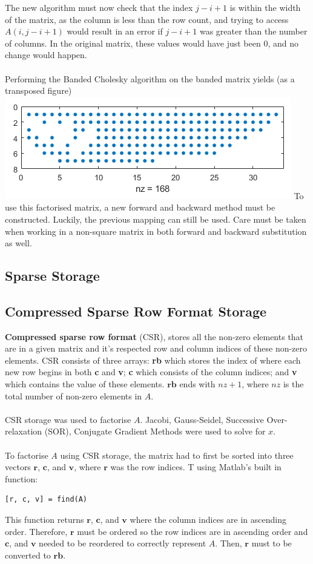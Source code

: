 \documentclass[12pt,a4paper]{article}
\begin{document}
The new algorithm must now check that the index $j-i+1$ is within the width of the matrix, as the column is less than the row count, and trying to access $A(i,j-i+1)$ would result in an error if $j-i+1$ was greater than the number of columns. In the original matrix, these values would have just been 0, and no change would happen.\\\\Performing the Banded Cholesky algorithm on the banded matrix yields (as a transposed figure) \\\includegraphics{images/cholband.png}
To use this factorised matrix, a new forward and backward method must be constructed. Luckily, the previous mapping can still be used. Care must be taken when working in a non-square matrix in both forward and backward substitution as well.
\subsection{Sparse Storage}

\subsection{Compressed Sparse Row Format Storage}
\textbf{Compressed sparse row format} (CSR), stores all the non-zero elements that are in a given matrix and it's respected row and column indices of these non-zero elements. CSR consists of three arrays: \textbf{rb} which stores the index of where each new row begins in both \textbf{c} and \textbf{v}; \textbf{c} which consists of the column indices; and \textbf{v} which contains the value of these elements. $\textbf{rb}$ ends with $nz + 1$, where $nz$ is the total number of non-zero elements in $A$.
\\\\
CSR storage was used to factorise $A$. Jacobi, Gauss-Seidel, Successive Over-relaxation (SOR), Conjugate Gradient Methods were used to solve for $x$.
\\\\
To factorise $A$ using CSR storage, the matrix had to first be sorted into three vectors $\textbf{r}$, $\textbf{c}$, and $\textbf{v}$, where $\textbf{r}$ was the row indices. T using Matlab's built in function: 
\begin{verbatim} 
[r, c, v] = find(A) 
\end{verbatim}
This function returns $\textbf{r}$, $\textbf{c}$, and $\textbf{v}$ where the column indices are in ascending order. Therefore, $\textbf{r}$ must be ordered so the row indices are in ascending order and $\textbf{c}$, and $\textbf{v}$ needed to be reordered to correctly represent $A$. Then, $\textbf{r}$ must to be converted to $\textbf{rb}$.
\end{document}
